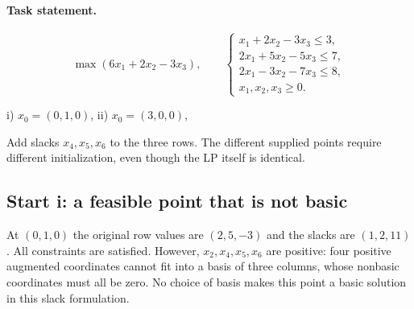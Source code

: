 \documentclass[11pt,a4paper]{article}
\begin{document}
\paragraph{Task statement.}
\[
  \max(6x_1+2x_2-3x_3),\qquad
  \begin{cases}
    x_1+2x_2-3x_3\leq3,  \\
    2x_1+5x_2-5x_3\leq7, \\
    2x_1-3x_2-7x_3\leq8, \\
    x_1,x_2,x_3\geq0.
  \end{cases}
\]
\begin{otherlanguage}{polish}
  i) $x_0=(0,1,0)$, ii) $x_0=(3,0,0)$,
\end{otherlanguage}
Add slacks $x_4,x_5,x_6$ to the three rows. The different supplied points
require different initialization, even though the LP itself is identical.

\subsection{Start i: a feasible point that is not basic}\label{sec:f-i}
At $(0,1,0)$ the original row values are $(2,5,-3)$ and the slacks are
$(1,2,11)$. All constraints are satisfied. However, $x_2,x_4,x_5,x_6$
are positive: four positive augmented coordinates cannot fit into a basis of
three columns, whose nonbasic coordinates must all be zero. No choice of
basis makes this point a basic solution in this slack formulation.
\end{document}
